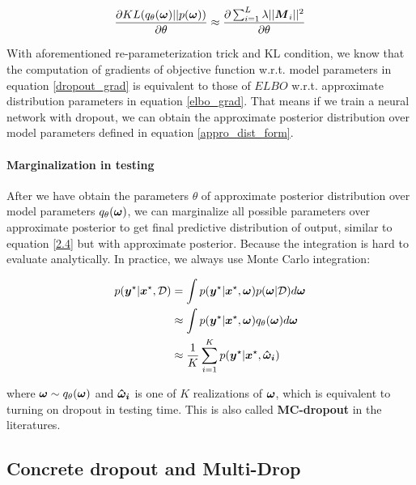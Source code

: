\begin{equation} 
\begin{aligned}\label{KL_grad}
\frac{\partial KL(q_{\theta}(\boldsymbol \omega)||p(\boldsymbol \omega))}{\partial \theta} \approx \frac{\partial \sum_{i=1}^{L}\lambda||\boldsymbol M_{i}||^{2}}{\partial \theta}
\end{aligned}
\end{equation}

With aforementioned re-parameterization trick and KL condition, we know that the computation of gradients of objective function w.r.t. model parameters in equation \ref{dropout_grad} is equivalent to those of $ELBO$ w.r.t. approximate distribution parameters in equation \ref{elbo_grad}. That means if we train a neural network with dropout, we can obtain the approximate posterior distribution over model parameters defined in equation \ref{appro_dist_form}.

\paragraph{Marginalization in testing}
After we have obtain the parameters $\theta$ of approximate posterior distribution over model parameters $q_{\theta}(\boldsymbol \omega)$, we can marginalize all possible parameters over approximate posterior to get final predictive distribution of output, similar to equation \ref{2.4} but with approximate posterior. Because the integration is hard to evaluate analytically. In practice, we always use Monte Carlo integration:

\begin{equation}
\begin{aligned} \label{marginalization_test}
p(\boldsymbol y^{\star}| \boldsymbol x^{\star},\mathcal D) &= \int p(\boldsymbol y^{\star} | \boldsymbol x^{\star}, \boldsymbol \omega) p(\boldsymbol \omega |\mathcal D)d\boldsymbol \omega \\
&\approx \int p(\boldsymbol y^{\star} | \boldsymbol x^{\star}, \boldsymbol \omega) q_{\theta}(\boldsymbol \omega)d\boldsymbol \omega \\
&\approx \frac{1}{K}\sum_{i=1}^{K} p(\boldsymbol y^{\star} | \boldsymbol x^{\star}, \boldsymbol{\hat \omega_{i}}) 
\end{aligned}
\end{equation}

where $\boldsymbol \omega \sim q_{\theta}(\boldsymbol \omega)$ and $\boldsymbol{\hat \omega_{i}}$ is one of $K$ realizations of $\boldsymbol \omega$, which is equivalent to turning on dropout in testing time. This is also called \textbf{MC-dropout} in the literatures.

\subsection{Concrete dropout and Multi-Drop}
